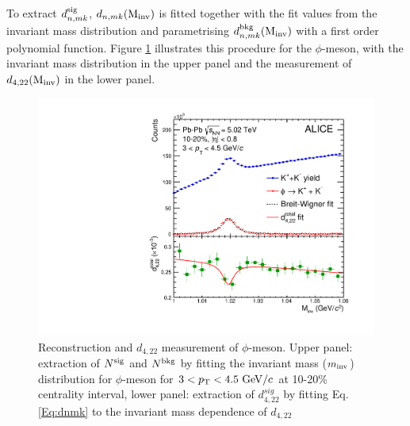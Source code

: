 To extract $d_{n,mk}^{\rm{sig}}$, $d_{n,mk}({\rm M_{inv}})$ is fitted together with the fit values from the invariant mass distribution and parametrising $d_{n,mk}^{\rm{bkg}}({\rm M_{inv}})$ with a first order polynomial function. Figure \ref{d422_phi_meson} illustrates this procedure for the $\phi$-meson, with the invariant mass distribution in the upper panel and the measurement of $d_{4,22}({\rm M_{inv}})$ in the lower panel. 

\begin{figure}[!htb]
\begin{center}
\includegraphics[scale=0.45]{figures/analysisMethod/flowmass_Phi.pdf}
\end{center}
\caption{Reconstruction and $d_{4,22}$ measurement of $\phi$-meson. Upper panel: extraction of $N^{\rm{sig}}$ and $N^{\rm{bkg}}$ by fitting the invariant mass ($m_{\rm{inv}}$) distribution for $\phi$-meson for $3<p_{\rm{T}}<4.5~{\rm GeV}/c$ at 10-20\% centrality interval, lower panel: extraction of $d_{4,22}^{sig}$ by fitting Eq. \ref{Eq:dnmk} to the invariant mass dependence of $d_{4,22}$}
\label{d422_phi_meson}
\end{figure}


